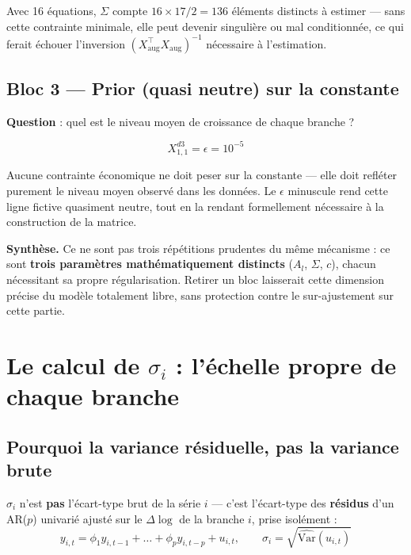 \documentclass[11pt,a4paper]{article}
\begin{document}
Avec 16 équations, $\Sigma$ compte $16\times17/2=136$ éléments distincts à estimer --- sans cette contrainte minimale, elle peut devenir singulière ou mal conditionnée, ce qui ferait échouer l'inversion $(X_{\text{aug}}^\top X_{\text{aug}})^{-1}$ nécessaire à l'estimation.

\subsection{Bloc 3 --- Prior (quasi neutre) sur la constante}

\textbf{Question} : quel est le niveau moyen de croissance de chaque branche ?

\begin{equation}
X^{d3}_{1,1} = \epsilon = 10^{-5}
\end{equation}

Aucune contrainte économique ne doit peser sur la constante --- elle doit refléter purement le niveau moyen observé dans les données. Le $\epsilon$ minuscule rend cette ligne fictive quasiment neutre, tout en la rendant formellement nécessaire à la construction de la matrice.

\begin{resultatbox}
\textbf{Synthèse.} Ce ne sont pas trois répétitions prudentes du même mécanisme : ce sont \textbf{trois paramètres mathématiquement distincts} ($A_l$, $\Sigma$, $c$), chacun nécessitant sa propre régularisation. Retirer un bloc laisserait cette dimension précise du modèle totalement libre, sans protection contre le sur-ajustement sur cette partie.
\end{resultatbox}

\section{Le calcul de $\sigma_i$ : l'échelle propre de chaque branche}
\label{sec:sigma}

\subsection{Pourquoi la variance résiduelle, pas la variance brute}

\begin{definitionbox}
$\sigma_i$ n'est \textbf{pas} l'écart-type brut de la série $i$ --- c'est l'écart-type des \textbf{résidus} d'un AR($p$) univarié ajusté sur le $\Delta\log$ de la branche $i$, prise isolément :
\begin{equation}
y_{i,t} = \phi_1 y_{i,t-1} + \dots + \phi_p y_{i,t-p} + u_{i,t}, \qquad \sigma_i = \sqrt{\widehat{\text{Var}}(u_{i,t})}
\end{equation}
\end{definitionbox}
\end{document}

